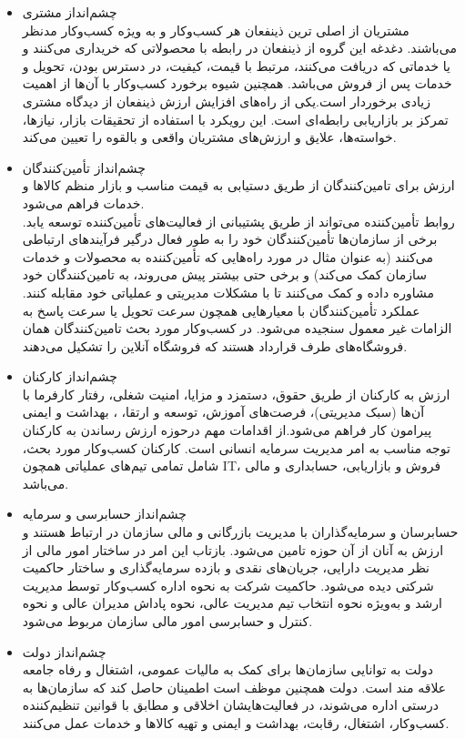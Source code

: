 \documentclass[14pt]{article}
\begin{document}
\begin{flushright}
\begin{itemize}
\item چشم‌انداز مشتری\\
مشتریان از اصلی ترین ذینفعان هر کسب‌وکار و به ویژه کسب‌و‌کار مدنظر می‌باشند. دغدغه این گروه از ذینفعان در رابطه با محصولاتی که خریداری می‌کنند و یا خدماتی که دریافت می‌کنند، مرتبط با قیمت، کیفیت، در دسترس بودن، تحویل و خدمات پس از فروش می‌باشد. همچنین شیوه برخورد کسب‌وکار با آن‌ها از اهمیت زیادی برخوردار است.یکی از راه‌های افزایش ارزش ذینفعان از دیدگاه مشتری تمرکز بر بازاریابی رابطه‌ای است. این رویکرد با استفاده از تحقیقات بازار، نیازها، خواسته‌ها، علایق و ارزش‌های مشتریان واقعی و بالقوه را تعیین می‌کند.\\
\item ‌چشم‌انداز تأمین‌کنندگان\\
ارزش برای تامین‌کنندگان از طریق دستیابی به قیمت مناسب و بازار منظم کالاها و خدمات فراهم می‌شود.\\
روابط تأمین‌کننده می‌تواند از طریق پشتیبانی از فعالیت‌های تأمین‌کننده توسعه یابد. برخی از سازمان‌ها تأمین‌کنندگان خود را به طور فعال درگیر فرآیندهای ارتباطی می‌کنند (به عنوان مثال در مورد راه‌هایی که تأمین‌کننده به محصولات و خدمات سازمان کمک می‌کند) و برخی حتی بیشتر پیش می‌روند، به تامین‌کنندگان خود مشاوره داده و کمک می‌کنند تا با مشکلات مدیریتی و عملیاتی خود مقابله کنند. عملکرد تأمین‌کنندگان با معیارهایی همچون سرعت تحویل یا سرعت پاسخ به الزامات غیر معمول سنجیده می‌شود. در کسب‌وکار مورد بحث تامین‌کنندگان همان فروشگاه‌های طرف قرارداد هستند که فروشگاه آنلاین را تشکیل می‌دهند.\\
 \item چشم‌انداز کارکنان\\
ارزش به کارکنان از طریق حقوق، دستمزد و مزایا، امنیت شغلی، رفتار کارفرما با آن‌ها (سبک مدیریتی)، فرصت‌های آموزش، توسعه و ارتقا، ، بهداشت و ایمنی پیرامون کار فراهم می‌شود.از اقدامات مهم درحوزه ارزش رساندن به کارکنان توجه مناسب به امر مدیریت سرمایه انسانی است. کارکنان کسب‌وکار مورد بحث، شامل تمامی تیم‌های عملیاتی همچون IT، فروش و بازاریابی، حسابداری و مالی می‌باشد.\\
 \item چشم‌انداز حسابرسی و سرمایه\\
حسابرسان و سرمایه‌گذاران با مدیریت بازرگانی و مالی سازمان در ارتباط هستند و ارزش به آنان از آن حوزه تامین می‌شود. بازتاب این امر در ساختار امور مالی از نظر مدیریت دارایی، جریان‌های نقدی و بازده سرمایه‌گذاری و ساختار حاکمیت شرکتی دیده می‌شود. حاکمیت شرکت به نحوه اداره کسب‌وکار توسط مدیریت ارشد و به‌ویژه نحوه انتخاب تیم مدیریت عالی، نحوه پاداش مدیران عالی و نحوه کنترل و حسابرسی امور مالی سازمان مربوط می‌شود.\\
\item ‌چشم‌انداز دولت\\
دولت به توانایی سازمان‌ها برای کمک به مالیات عمومی، اشتغال و رفاه جامعه علاقه مند است. دولت همچنین موظف است اطمینان حاصل کند که سازمان‌ها به درستی اداره می‌شوند، در فعالیت‌هایشان اخلاقی و مطابق با قوانین تنظیم‌کننده کسب‌وکار، اشتغال، رقابت، بهداشت و ایمنی و تهیه کالاها و خدمات عمل می‌کنند. \\





\end{itemize}
\end{flushright}
\end{document}
